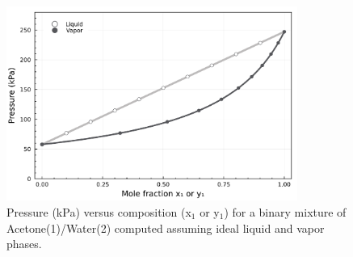 \begin{figure}[h!]\centering
    \captionsetup{width=0.85\linewidth}
    \includegraphics[width=0.85\textwidth]{./figs/Fig-Pxy-acetone-water-85C-AP2.pdf}
    \caption{Pressure (kPa) versus composition (x$_{1}$ or y$_{1}$) for a binary mixture of Acetone(1)/Water(2) computed assuming ideal liquid and vapor phases.}\label{fig-VLE-ideal-problem}
    \end{figure}
    
